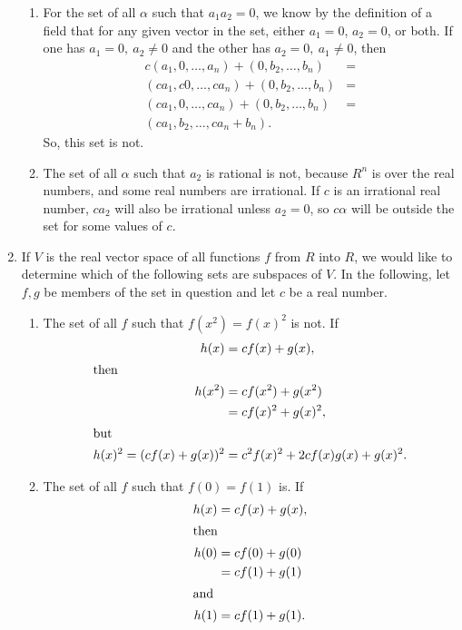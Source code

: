 \documentclass[12pt]{article}
\begin{document}
\begin{enumerate}
\begin{enumerate}
      \item
        For the set of all $\alpha$ such that $a_1a_2 = 0$, we know by the definition
        of a field that for any given vector in the set, either $a_1 = 0$, $a_2 = 0$,
        or both. If one has $a_1 = 0,\ a_2 \neq 0$ and the other has $a_2 = 0,\ a_1
        \neq 0$, then
        \begin{align*}
          c(a_1,0,\ldots,a_n) + (0,b_2,\ldots,b_n) &=\\
          (ca_1,c0,\ldots,ca_n) + (0,b_2,\ldots,b_n) &=\\
          (ca_1,0,\ldots,ca_n) + (0,b_2,\ldots,b_n) &=\\
          (ca_1,b_2,\ldots,ca_n+b_n).
        \end{align*}
        So, this set is not.

      \item
        The set of all $\alpha$ such that $a_2$ is rational is not, because $R^n$ is
        over the real numbers, and some real numbers are irrational. If $c$ is an
        irrational real number, $ca_2$ will also be irrational unless $a_2 = 0$, so
        $c\alpha$ will be outside the set for some values of $c$.
    \end{enumerate}

    \item
      If $V$ is the real vector space of all functions $f$ from $R$ into $R$, we
      would like to determine which of the following sets are subspaces of $V$. In
      the following, let $f,g$ be members of the set in question and let $c$ be a
      real number.
      \begin{enumerate}
        \item
          The set of all $f$ such that $f(x^2) = f(x)^2$ is not. If
          \begin{align*}
            h(x) &= cf(x) + g(x),\\
            \shortintertext{then}
            h(x^2) &= cf(x^2) + g(x^2)\\
            &= cf(x)^2 + g(x)^2,\\
            \shortintertext{but}
            h(x)^2 = (cf(x) + g(x))^2 &= c^2f(x)^2 + 2cf(x)g(x) + g(x)^2.
          \end{align*}

        \item
          The set of all $f$ such that $f(0) = f(1)$ is. If
          \begin{align*}
            h(x) &= cf(x) + g(x),\\
            \shortintertext{then}
            h(0) &= cf(0) + g(0)\\
            &= cf(1) + g(1)\\
            \shortintertext{and}
            h(1) &= cf(1) + g(1).
          \end{align*}


\end{enumerate}
\end{enumerate}
\end{document}
